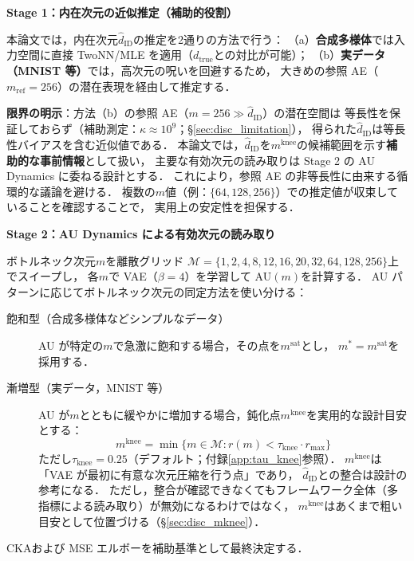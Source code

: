 \documentclass[11pt,a4paper]{jsarticle}
\newcommand{\dzopt}{m^*}
\newcommand{\dtrue}{d_{\mathrm{true}}}
\newcommand{\kap}{\kappa}
\newcommand{\dzsat}{m^{\mathrm{sat}}}
\newcommand{\mknee}{m^{\mathrm{knee}}}
\begin{document}
\textbf{Stage 1：内在次元の近似推定（補助的役割）}

本論文では，内在次元$\hat{d}_\mathrm{ID}$の推定を2通りの方法で行う：
（a）\textbf{合成多様体}では入力空間に直接 TwoNN/MLE を適用（$\dtrue$との対比が可能）；
（b）\textbf{実データ（MNIST 等）}では，高次元の呪いを回避するため，
大きめの参照 AE（$m_{\mathrm{ref}} = 256$）の潜在表現を経由して推定する．

\textbf{限界の明示}：方法（b）の参照 AE（$m = 256 \gg \hat{d}_\mathrm{ID}$）の潜在空間は
等長性を保証しておらず（補助測定：$\kap \approx 10^9$；§\ref{sec:disc_limitation}），
得られた$\hat{d}_\mathrm{ID}$は等長性バイアスを含む近似値である．
本論文では，$\hat{d}_\mathrm{ID}$を$\mknee$の候補範囲を示す\textbf{補助的な事前情報}として扱い，
主要な有効次元の読み取りは Stage 2 の AU Dynamics に委ねる設計とする．
これにより，参照 AE の非等長性に由来する循環的な議論を避ける．
複数の$m$値（例：$\{64, 128, 256\}$）での推定値が収束していることを確認することで，
実用上の安定性を担保する．

\textbf{Stage 2：AU Dynamics による有効次元の読み取り}

ボトルネック次元$m$を離散グリッド
$\mathcal{M} = \{1, 2, 4, 8, 12, 16, 20, 32, 64, 128, 256\}$上でスイープし，
各$m$で VAE（$\beta = 4$）を学習して AU$(m)$を計算する．
AU パターンに応じてボトルネック次元の同定方法を使い分ける：

\begin{description}
  \item[飽和型（合成多様体などシンプルなデータ）]
        AU が特定の$m$で急激に飽和する場合，その点を$\dzsat$とし，
        $\dzopt = \dzsat$を採用する．
  \item[漸増型（実データ，MNIST 等）]
        AU が$m$とともに緩やかに増加する場合，鈍化点$\mknee$を実用的な設計目安とする：
        \begin{equation}
          \mknee = \min\{m \in \mathcal{M} : r(m) < \tau_{\mathrm{knee}} \cdot r_{\max}\}
          \label{eq:mknee}
        \end{equation}
        ただし$\tau_{\mathrm{knee}} = 0.25$（デフォルト；付録\ref{app:tau_knee}参照）．
        $\mknee$は「VAE が最初に有意な次元圧縮を行う点」であり，
        $\hat{d}_\mathrm{ID}$との整合は設計の参考になる．
        ただし，整合が確認できなくてもフレームワーク全体（多指標による読み取り）が無効になるわけではなく，
        $\mknee$はあくまで粗い目安として位置づける（§\ref{sec:disc_mknee}）．
\end{description}

CKA\cite{kornblith2019cka}および MSE エルボーを補助基準として最終決定する．
\end{document}
